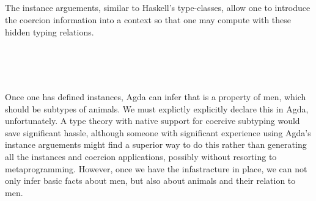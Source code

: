 \begin{code}
\AgdaSpace{}%
\AgdaSymbol{\{\{}\AgdaSymbol{\}\}}\AgdaSpace{}%
\AgdaSpace{}%
\AgdaSymbol{=}\AgdaSpace{}%
\AgdaSpace{}%
\AgdaSymbol{(}\AgdaSpace{}%
\AgdaSpace{}%
\AgdaSymbol{)}\<%
\\
%
\\[\AgdaEmptyExtraSkip]%
\>[0]\<%
\\
\>[0][@{}l@{\AgdaIndent{0}}]%
\>[2]\AgdaSpace{}%
\AgdaSymbol{:}\AgdaSpace{}%
\AgdaSpace{}%
\AgdaSpace{}%
\<%
\\
%
\>[2]\AgdaSpace{}%
\AgdaSymbol{:}\AgdaSpace{}%
\AgdaSpace{}%
\AgdaSpace{}%
\<%
\end{code}

The instance arguements, similar to Haskell's type-classes, allow one to
introduce the coercion information into a context so that one may compute with
these hidden typing relations.

\begin{code}%
\>[0]\<%
\\
\>[0][@{}l@{\AgdaIndent{0}}]%
\>[2]\AgdaSpace{}%
\AgdaSymbol{=}\AgdaSpace{}%
\AgdaSpace{}%
\AgdaSpace{}%
\<%
\\
%
\>[2]\AgdaSpace{}%
\AgdaSymbol{=}\AgdaSpace{}%
\AgdaSpace{}%
\AgdaSpace{}%
\<%
\\
%
\>[2]\AgdaSpace{}%
\AgdaSymbol{=}\AgdaSpace{}%
\AgdaSpace{}%
\AgdaSpace{}%
\<%
\end{code}

Once one has defined instances, Agda can infer that  is a property of
men, which should be subtypes of animals. We must explictly explicitly declare
this in Agda, unfortunately. A type theory with native support for coercive
subtyping would save significant hassle, although someone with significant
experience using Agda's instance arguements might find a superior way to do this
rather than generating all the instances and coercion applications, possibly
without resorting to metaprogramming. However, once we have the infastracture in
place, we can not only infer basic facts about men, but also about animals and
their relation to men.


